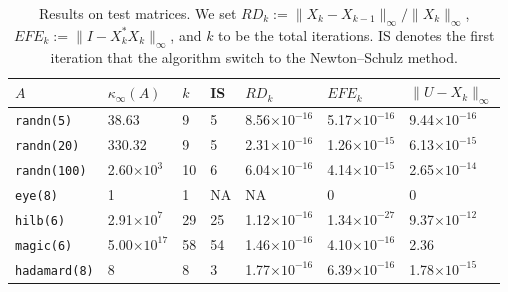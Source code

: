 \documentclass[12pt]{article}
\def\norm#1{\|#1\|}
\def\t#1{\texttt{\upshape #1}}
\begin{document}
\begin{table}[ht]

	\begin{center}
				\caption{Results on test matrices. We set $RD_k:=\norm{X_k-X_{k-1}}_\infty/\norm{X_k}_\infty$, $EFE_k:=\norm{I-X_k^*{X_k}}_\infty$, and $k$ to be the total iterations. IS denotes the first iteration that the algorithm switch to the Newton--Schulz method.}
		\begin{tabular}{lllllll} 
			\hline
			 $A$ & $\kappa_\infty(A)$ &  $k$ & IS & $RD_k$  & $EFE_k$ &  $\norm{U-X_k}_\infty$ \\
			\hline
		    \t{randn(5)} &  38.63 & 9 & 5 & 8.56$\times 10^{-16}$ & 5.17$\times 10^{-16}$ &  9.44$\times 10^{-16}$   \\
		   \t{randn(20)} & 330.32 & 9 & 5 & 2.31$\times 10^{-16}$ & 1.26$\times 10^{-15}$ & 6.13$\times 10^{-15}$ \\
		   \t{randn(100)}& 2.60$\times 10^{3}$ &10 & 6&  6.04$\times 10^{-16}$& 4.14$\times 10^{-15}$ & 2.65$\times 10^{-14}$ \\
		   \t{eye(8)}    & 1 & 1 & NA & NA&  0 & 0 \\
		   \t{hilb(6)}   & 2.91$\times 10^{7}$& 29 & 25 & 1.12$\times 10^{-16}$ & 1.34$\times 10^{-27}$ & 9.37$\times 10^{-12}$ \\
		   \t{magic(6)}  & 5.00$\times 10^{17}$& 58 & 54 & 1.46$\times 10^{-16}$ & 4.10$\times 10^{-16}$ & 2.36 \\
		   \t{hadamard(8)} &  8 & 8 & 3 & 1.77$\times 10^{-16}$ &  6.39$\times 10^{-16}$ & 1.78$\times 10^{-15}$ \\	
			\hline		
		\end{tabular}
		\label{table}
	\end{center}
\end{table}
\end{document}
